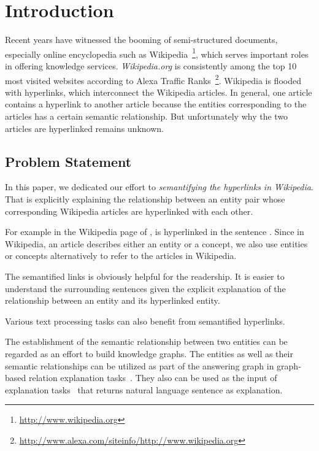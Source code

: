 \section{Introduction}
Recent years have witnessed the booming of semi-structured documents, especially online encyclopedia such as  Wikipedia~\footnote{\small\url{http://www.wikipedia.org}}, which serves important roles in offering knowledge services.
{\it Wikipedia.org} is consistently among the top 10 most visited websites according to Alexa Traffic Ranks~\footnote{\small\url{http://www.alexa.com/siteinfo/http://www.wikipedia.org}}.
Wikipedia is flooded with hyperlinks, which interconnect the Wikipedia articles.
In general, one article contains a hyperlink to another article because the entities corresponding to the articles has a certain semantic relationship.
But unfortunately why the two articles are hyperlinked remains unknown.

\subsection{Problem Statement}
In this paper, we dedicated our effort to {\it semantifying the hyperlinks in Wikipedia}.
That is explicitly explaining the relationship between an entity pair whose corresponding Wikipedia articles are hyperlinked with each other.

For example in the Wikipedia page of ,  is hyperlinked in the sentence  .
Since in Wikipedia, an article describes either an entity or a concept, we also use entities or concepts alternatively to refer to the articles in Wikipedia.

The semantified links is obviously helpful for the readership.
It is easier to understand the surrounding sentences given the explicit explanation of the relationship between an entity and its hyperlinked entity. 

Various text processing tasks can also benefit from semantified hyperlinks.

The establishment of the semantic relationship between two entities can be regarded as an effort to build knowledge graphs.
The entities as well as their semantic relationships can be utilized as part of the answering graph in graph-based relation explanation tasks~\cite{fang2011rex}.
They also can be used as the input of explanation tasks~\cite{voskarideslearning} that returns natural language sentence as explanation.


